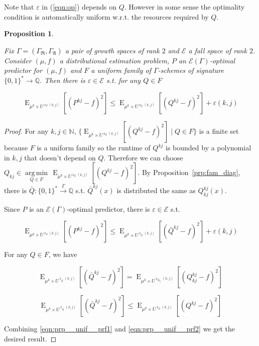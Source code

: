 \documentclass{article}
\numberwithin{equation}{section}
\theoremstyle{definition}
\theoremstyle{plain}
\newtheorem{proposition}{Proposition}[section]
\newcommand{\Words}{{\{ 0, 1 \}^*}}
\DeclareMathOperator{\E}{E}
\DeclareMathOperator{\R}{r}
\newcommand{\Argmin}[1]{\underset{#1}{\operatorname{arg\,min}}\,}
\newcommand{\Nats}{\mathbb{N}}
\newcommand{\Rats}{\mathbb{Q}}
\newcommand{\GrowR}{\Gamma_{\mathfrak{R}}}
\newcommand{\GrowA}{\Gamma_{\mathfrak{A}}}
\newcommand{\Fall}{\mathcal{E}}
\newcommand{\Scheme}{\xrightarrow{\Gamma}}
\begin{document}
Note that $\varepsilon$ in (\ref{eqn:op}) depends on $Q$. However in some sense the optimality condition is automatically uniform w.r.t. the resources required by $Q$.

\begin{proposition}
\label{prp:unif}

Fix $\Gamma=(\GrowR,\GrowA)$ a pair of growth spaces of rank $2$ and $\Fall$ a fall space of rank $2$. Consider $(\mu,f)$ a distributional estimation problem, $P$ an $\Fall(\Gamma)$-optimal predictor for $(\mu,f)$ and $F$ a uniform family of $\Gamma$-schemes of signature $\Words \rightarrow \Rats$. Then there is $\varepsilon \in \Fall$ s.t. for any $Q \in F$

\begin{equation}
\E_{\mu^k \times U^{\R_P(k,j)}}[(P^{kj} - f)^2] \leq \E_{\mu^k \times U^{\R_Q(k,j)}}[(Q^{kj} - f)^2] + \varepsilon(k,j)
\end{equation}

\end{proposition}

\begin{proof}

For any $k,j \in \Nats$, $\{\E_{\mu^k \times U^{\R_Q(k,j)}}[(Q^{kj} - f)^2] \mid Q \in F\}$ is a finite set because $F$ is a uniform family so the runtime of $Q^{kj}$ is bounded by a polynomial in $k,j$ that doesn't depend on $Q$. Therefore we can choose ${Q_{kj} \in \Argmin{Q \in F} \E_{\mu^k \times U^{\R_Q(k,j)}}[(Q^{kj} - f)^2]}$. By Proposition~\ref{prp:fam_diag}, there is $\bar{Q}: \Words \Scheme \Rats$ s.t. $\bar{Q}^{kj}(x)$ is distributed the same as $Q_{kj}^{kj}(x)$.

Since $P$ is an $\Fall(\Gamma)$-optimal predictor, there is $\varepsilon \in \Fall$ s.t.

\begin{equation}
\label{eqn:prp__unif__prf1}
\E_{\mu^k \times U^{\R_P(k,j)}}[(P^{kj} - f)^2] \leq \E_{\mu^k \times U^{\R_{\bar{Q}}(k,j)}}[(\bar{Q}^{kj} - f)^2] + \varepsilon(k,j)
\end{equation}

For any $Q \in F$, we have 

$$\E_{\mu^k \times U^{\R_{\bar{Q}}(k,j)}}[(\bar{Q}^{kj} - f)^2]=\E_{\mu^k \times U^{\R_{Q_{kj}}(k,j)}}[(Q_{kj}^{kj} - f)^2]$$

\begin{equation}
\label{eqn:prp__unif__prf2}
\E_{\mu^k \times U^{\R_{\bar{Q}}(k,j)}}[(\bar{Q}^{kj} - f)^2] \leq \E_{\mu^k \times U^{\R_Q(k,j)}}[(Q^{kj} - f)^2]
\end{equation}

Combining \ref{eqn:prp__unif__prf1} and \ref{eqn:prp__unif__prf2} we get the desired result.

\end{proof}
\end{document}
